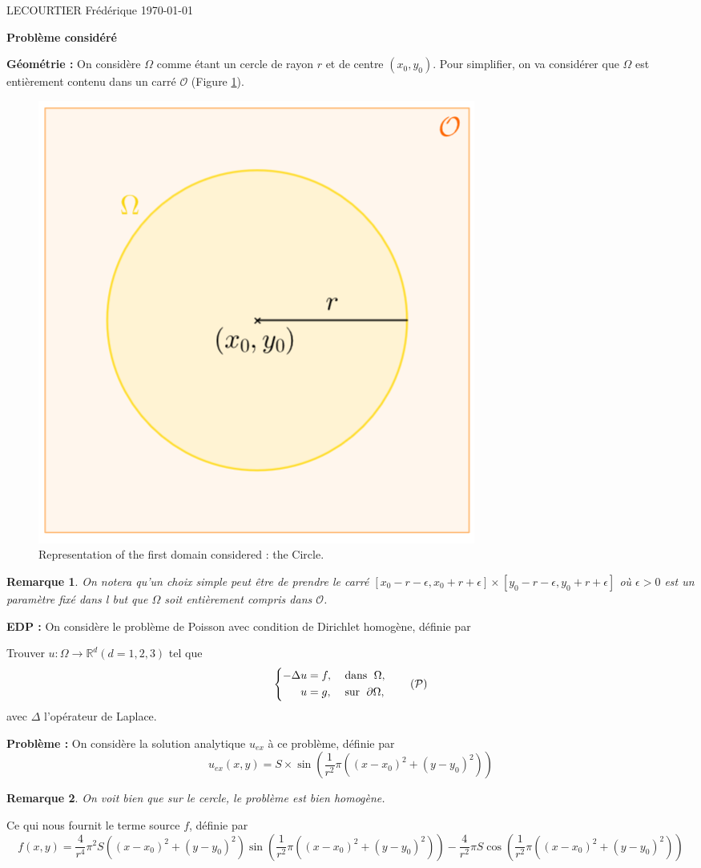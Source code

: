 \documentclass[french]{article}
\newtheorem*{Rem}{Remarque}
\begin{document}
	LECOURTIER Frédérique \hfill \today
	\begin{center}
		\Large\textbf{{Problème considéré}}\\
	\end{center}
	
	\textbf{Géométrie :} On considère $\Omega$ comme étant un cercle de rayon $r$ et de centre $(x_0,y_0)$. Pour simplifier, on va considérer que $\Omega$ est entièrement contenu dans un carré $\mathcal{O}$ (Figure \ref{geom_circle}). 
	\begin{figure}[H]
		\centering
		\includegraphics[width=0.3\linewidth]{"geom_circle.png"}
		\caption{Representation of the first domain considered : the Circle.}
		\label{geom_circle}
	\end{figure}
	\begin{Rem}
		On notera qu'un choix simple peut être de prendre le carré $[x_0-r-\epsilon,x_0+r+\epsilon]\times[y_0-r-\epsilon,y_0+r+\epsilon]$ où $\epsilon>0$ est un paramètre fixé dans l but que $\Omega$ soit entièrement compris dans $\mathcal{O}$.
	\end{Rem}
	
	\textbf{EDP :} On considère le problème de Poisson avec condition de Dirichlet homogène, définie par
	
	Trouver $u : \Omega \rightarrow \mathbb{R}^d (d=1,2,3)$ tel que
	\begin{equation}
		\left\{
		\begin{aligned}
			-\Delta u &= f, \; &&\text{dans } \; \Omega, \\
			u&=g, \; &&\text{sur } \; \partial\Omega,
		\end{aligned}
		\right. \tag{$\mathcal{P}$} \label{pb_initial}
	\end{equation}
	avec $\Delta$ l'opérateur de Laplace.

	\textbf{Problème :} On considère la solution analytique $u_{ex}$ à ce problème, définie par
	\begin{equation*}
		u_{ex}(x,y)=S\times\sin\left(\frac{1}{r^2}\pi((x-x_0)^2+(y-y_0)^2)\right)
	\end{equation*}

	\begin{Rem}
		On voit bien que sur le cercle, le problème est bien homogène.
	\end{Rem}

	Ce qui nous fournit le terme source $f$, définie par
	\begin{equation*}
		f(x,y)=\frac{4}{r^4}\pi^2S((x-x_0)^2+(y-y_0)^2)\sin\left(\frac{1}{r^2}\pi((x-x_0)^2+(y-y_0)^2)\right)-\frac{4}{r^2}\pi S \cos\left(\frac{1}{r^2}\pi((x-x_0)^2+(y-y_0)^2)\right)
	\end{equation*}
\end{document}
